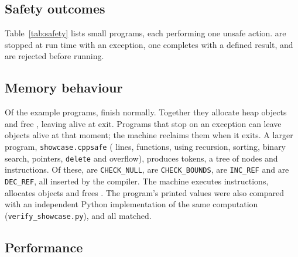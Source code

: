 \documentclass[conference]{IEEEtran}
\begin{document}
\subsection{Safety outcomes}
Table~\ref{tab:safety} lists  small programs, each performing one unsafe action.  are
stopped at run time with an exception, one completes with a defined result, and  are rejected
before running.

\begin{table}[t]
\caption{Result of each unsafe action (observed). ``Line'' is the source line reported.}
\label{tab:safety}
\centering
\small

\end{table}

\subsection{Memory behaviour}
Of the  example programs,  finish normally. Together they allocate
 heap objects and free , leaving  alive at
exit. Programs that stop on an exception can leave objects alive at that moment; the machine reclaims them when it
exits. A larger program, \texttt{showcase.cppsafe} ( lines,  functions,
using recursion, sorting, binary search, pointers, \texttt{delete} and overflow), produces  tokens,
a tree of  nodes and  instructions. Of these, 
are \texttt{CHECK\_NULL},  are \texttt{CHECK\_BOUNDS},  are
\texttt{INC\_REF} and  are \texttt{DEC\_REF}, all inserted by the compiler. The machine executes
 instructions, allocates  objects and frees . The program's
 printed values were also compared with an independent Python implementation of the same
computation (\texttt{verify\_showcase.py}), and all matched.

\subsection{Performance}
\begin{table}[t]
\caption{Wall-clock time in milliseconds (median of  runs, including process start-up). Ratio is VM
(Release) divided by native.}
\label{tab:perf}
\centering
\small\setlength{\tabcolsep}{3pt}

\end{table}
\end{document}
